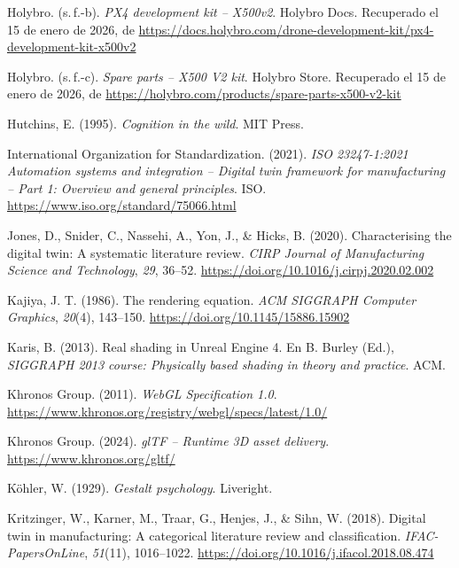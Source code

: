 \begin{list}{}
\item Holybro. (s.\,f.-b). \textit{PX4 development kit -- X500v2}. Holybro Docs. Recuperado el 15 de enero de 2026, de \url{https://docs.holybro.com/drone-development-kit/px4-development-kit-x500v2}

\item Holybro. (s.\,f.-c). \textit{Spare parts -- X500 V2 kit}. Holybro Store. Recuperado el 15 de enero de 2026, de \url{https://holybro.com/products/spare-parts-x500-v2-kit}

\item Hutchins, E. (1995). \textit{Cognition in the wild}. MIT Press.

\item International Organization for Standardization. (2021). \textit{ISO 23247-1:2021 Automation systems and integration -- Digital twin framework for manufacturing -- Part 1: Overview and general principles}. ISO. \url{https://www.iso.org/standard/75066.html}

\item Jones, D., Snider, C., Nassehi, A., Yon, J., \& Hicks, B. (2020). Characterising the digital twin: A systematic literature review. \textit{CIRP Journal of Manufacturing Science and Technology}, \textit{29}, 36--52. \url{https://doi.org/10.1016/j.cirpj.2020.02.002}

\item Kajiya, J. T. (1986). The rendering equation. \textit{ACM SIGGRAPH Computer Graphics}, \textit{20}(4), 143--150. \url{https://doi.org/10.1145/15886.15902}

\item Karis, B. (2013). Real shading in Unreal Engine 4. En B. Burley (Ed.), \textit{SIGGRAPH 2013 course: Physically based shading in theory and practice}. ACM.

\item Khronos Group. (2011). \textit{WebGL Specification 1.0}. \url{https://www.khronos.org/registry/webgl/specs/latest/1.0/}

\item Khronos Group. (2024). \textit{glTF -- Runtime 3D asset delivery}. \url{https://www.khronos.org/gltf/}

\item Köhler, W. (1929). \textit{Gestalt psychology}. Liveright.

\item Kritzinger, W., Karner, M., Traar, G., Henjes, J., \& Sihn, W. (2018). Digital twin in manufacturing: A categorical literature review and classification. \textit{IFAC-PapersOnLine}, \textit{51}(11), 1016--1022. \url{https://doi.org/10.1016/j.ifacol.2018.08.474}


\end{list}

